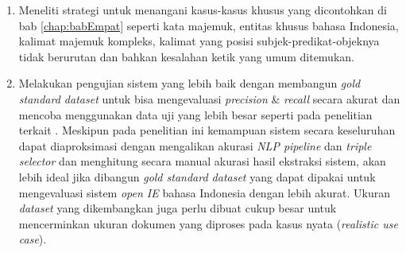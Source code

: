 \begin{enumerate}
	\item Meneliti strategi untuk menangani kasus-kasus khusus yang dicontohkan di bab \ref{chap:babEmpat} seperti kata majemuk, entitas khusus bahasa Indonesia, kalimat majemuk kompleks, kalimat yang posisi subjek-predikat-objeknya tidak berurutan dan bahkan kesalahan ketik yang umum ditemukan.
	
	\item Melakukan pengujian sistem yang lebih baik dengan membangun \textit{gold standard dataset} untuk bisa mengevaluasi \textit{precision} \& \textit{recall} secara akurat dan mencoba menggunakan data uji yang lebih besar seperti pada penelitian terkait \citep{banko2007open}. Meskipun pada penelitian ini kemampuan sistem secara keseluruhan dapat diaproksimasi dengan mengalikan akurasi \textit{NLP pipeline} dan \textit{triple selector} dan menghitung secara manual akurasi hasil ekstraksi sistem, akan lebih ideal jika dibangun \textit{gold standard dataset} yang dapat dipakai untuk mengevaluasi sistem \textit{open IE} bahasa Indonesia dengan lebih akurat. Ukuran \textit{dataset} yang dikembangkan juga perlu dibuat cukup besar untuk mencerminkan ukuran dokumen yang diproses pada kasus nyata (\textit{realistic use case}).
	
\end{enumerate}
